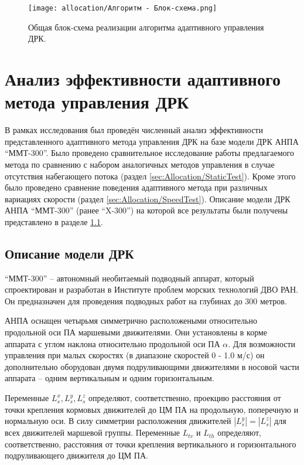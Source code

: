 
\begin{figure}[ht]
    \centering
    \texttt{[image: allocation/Алгоритм - Блок-схема.png]}
    \caption{Общая блок-схема реализации алгоритма адаптивного управления ДРК.}
    \label{fig:method_algorithm}
\end{figure}

\section{Анализ эффективности адаптивного метода управления ДРК}
В рамках исследования был проведён численный анализ эффективности представленного адаптивного метода управления ДРК на базе модели ДРК АНПА ``ММТ-300''\cite{борейко2019малогабаритный}.
Было проведено сравнительное исследование работы предлагаемого метода по сравнению с набором аналогичных методов управления в случае отсутствия набегающего потока (раздел \ref{sec:Allocation/StaticTest}).
Кроме этого было проведено сравнение поведения адаптивного метода при различных вариациях скорости (раздел \ref{sec:Allocation/SpeedTest}).
Описание модели ДРК АНПА ``ММТ-300'' (ранее ``X-300'') на которой все результаты были получены представлено в разделе \ref{ssec:Allocation/PropulsionDescription}.

\subsection{Описание модели ДРК}\label{ssec:Allocation/PropulsionDescription}
``ММТ-300'' -- автономный необитаемый подводный аппарат, который спроектирован и разработан в Институте проблем морских технологий ДВО РАН.
Он предназначен для проведения подводных работ на глубинах до 300 метров.

АНПА оснащен четырьмя симметрично расположеными относительно продольной оси ПА маршевыми движителями. 
Они установлены в корме аппарата с углом наклона относительно продольной оси ПА $\alpha$.
Для возможности управления при малых скоростях (в диапазоне скоростей 0 - 1.0 м/с) он дополнительно оборудован двумя подруливающими движителями в носовой части аппарата -- одним вертикальным и одним горизонтальным.

Переменные $L_s^x, L_s^y, L_s^z$ определяют, соответственно, проекцию расстояния от точки крепления кормовых движителей до ЦМ ПА на продольную, поперечную и нормальную оси.
В силу симметрии расположения движителей $|L_s^y| = |L_s^z|$ для всех движителей маршевой группы.
Переменные $L_{tv}$ и $L_{th}$ определяют, соответственно, расстояния от точки крепления вертикального и горизонтального подруливающего движителя до ЦМ ПА.


